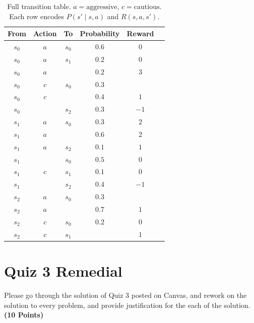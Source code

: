\documentclass[12pt, xcolor=dvipsnames,svgnames,x11names]{article}
\begin{document}
\begin{enumerate}
\begin{table}[htpb]
\centering
\renewcommand{\arraystretch}{1.3}
\begin{tabular}{cccccc}
\hline
\textbf{From} & \textbf{Action} & \textbf{To} & \textbf{Probability} & \textbf{Reward} \\
\hline
$s_0$ & $a$ & $s_0$ & $0.6$ & $0$  \\
$s_0$ & $a$ & $s_1$ & $0.2$ & $0$  \\
$s_0$ & $a$ &  & $0.2$ & $3$  \\
$s_0$ & $c$ & $s_0$ & $0.3$ &   \\
$s_0$ & $c$ &  & $0.4$ & $1$  \\
$s_0$ &  & $s_2$ & $0.3$ & $-1$ \\
\hline
$s_1$ & $a$ & $s_0$ & $0.3$ & $2$  \\
$s_1$ & $a$ &  & $0.6$ & $2$  \\
$s_1$ & $a$ & $s_2$ & $0.1$ & $1$  \\
$s_1$ &  & $s_0$ & $0.5$ & $0$  \\
$s_1$ & $c$ & $s_1$ & $0.1$ & $0$  \\
$s_1$ &  & $s_2$ & $0.4$ & $-1$ \\
\hline
$s_2$ & $a$ & $s_0$ & $0.3$ &    \\
$s_2$ & $a$ &  & $0.7$ & $1$  \\
$s_2$ & $c$ & $s_0$ & $0.2$ & $0$  \\
$s_2$ & $c$ & $s_1$ &  & $1$  \\
\hline
\end{tabular}
\caption{Full transition table. $a = \text{aggressive}$, $c = \text{cautious}$.
         Each row encodes $P(s' \mid s, a)$ and $R(s, a, s')$.}
\label{tab:transitions}
\end{table}




\end{enumerate}

%

\section{Quiz 3 Remedial}

Please go through the solution of Quiz 3 posted on Canvas, and rework on the solution to every problem, and provide justification for the each of the solution. \hfill \textbf{(10 Points)}
\end{document}

